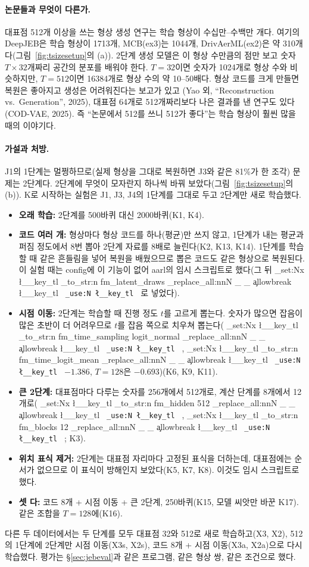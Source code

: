 \documentclass[11pt]{article}
\DeclareRobustCommand{\key}[1]{
  \tl_set:Nx \l__key_tl { \tl_to_str:n {#1} }
  \regex_replace_all:nnN { \_ } { \cO\_ \c{allowbreak} } \l__key_tl
  \texttt{ \tl_use:N \l__key_tl }
}
\begin{document}
\paragraph{논문들과 무엇이 다른가.} 대표점 512개 이상을 쓰는 형상 생성 연구는 학습 형상이 수십만--수백만 개다.
여기의 DeepJEB은 학습 형상이 1713개, MCB(ex3)는 1044개, DrivAerML(ex2)은 약 310개다(그림~\ref{fig:tsizesetup}의 (a)).
2단계 생성 모델은 이 형상 수만큼의 점만 보고 숫자 $T\times32$개짜리 공간의 분포를 배워야 한다. $T=32$이면 숫자가 1024개로 형상 수와 비슷하지만,
$T=512$이면 16384개로 형상 수의 약 10--50배다. 형상 코드를 크게 만들면 복원은 좋아지고 생성은 어려워진다는 보고가 있고
(Yao 외, ``Reconstruction vs.\ Generation'', 2025), 대표점 64개로 512개짜리보다 나은 결과를 낸 연구도 있다(COD-VAE, 2025).
즉 ``논문에서 512를 쓰니 512가 좋다''는 학습 형상이 훨씬 많을 때의 이야기다.

\paragraph{가설과 처방.} J1의 1단계는 멀쩡하므로(실제 형상을 그대로 복원하면 J3와 같은 81\%가 한 조각) 문제는 2단계다.
2단계에 무엇이 모자란지 하나씩 바꿔 보았다(그림~\ref{fig:tsizesetup}의 (b)). K로 시작하는 실험은 J1, J3, J4의 1단계를 그대로 두고 2단계만 새로 학습했다.
\begin{itemize}
\item \textbf{오래 학습:} 2단계를 500바퀴 대신 2000바퀴(K1, K4).
\item \textbf{코드 여러 개:} 형상마다 형상 코드를 하나(평균)만 쓰지 않고, 1단계가 내는 평균과 퍼짐 정도에서 8번 뽑아 2단계 자료를 8배로 늘린다(K2, K13, K14).
1단계를 학습할 때 같은 흔들림을 넣어 복원을 배웠으므로 뽑은 코드도 같은 형상으로 복원된다. 이 실험 때는 config에 이 기능이 없어 aarl의 임시 스크립트로 했다(그 뒤 \key{fm_latent_draws}로 넣었다).
\item \textbf{시점 이동:} 2단계는 학습할 때 진행 정도 $t$를 고르게 뽑는다. 숫자가 많으면 잡음이 많은 초반이 더 어려우므로
$t$를 잡음 쪽으로 치우쳐 뽑는다(\key{fm_time_sampling logit_normal}, \key{fm_time_logit_mean} $-1.386$, $T=128$은 $-0.693$)(K6, K9, K11).
\item \textbf{큰 2단계:} 대표점마다 다루는 숫자를 256개에서 512개로, 계산 단계를 8개에서 12개로(\key{fm_hidden 512}, \key{fm_blocks 12}; K3).
\item \textbf{위치 표식 제거:} 2단계는 대표점 자리마다 고정된 표식을 더하는데, 대표점에는 순서가 없으므로 이 표식이 방해인지 보았다(K5, K7, K8). 이것도 임시 스크립트로 했다.
\item \textbf{셋 다:} 코드 8개 + 시점 이동 + 큰 2단계, 250바퀴(K15, 모델 씨앗만 바꾼 K17). 같은 조합을 $T=128$에(K16).
\end{itemize}
다른 두 데이터에서는 두 단계를 모두 대표점 32와 512로 새로 학습하고(X3, X2), 512의 1단계에 2단계만 시점 이동(X3s, X2s), 코드 8개 + 시점 이동(X3a, X2a)으로 다시 학습했다.
평가는 \S\ref{sec:jebeval}과 같은 프로그램, 같은 형상 쌍, 같은 조건으로 했다.
\end{document}
